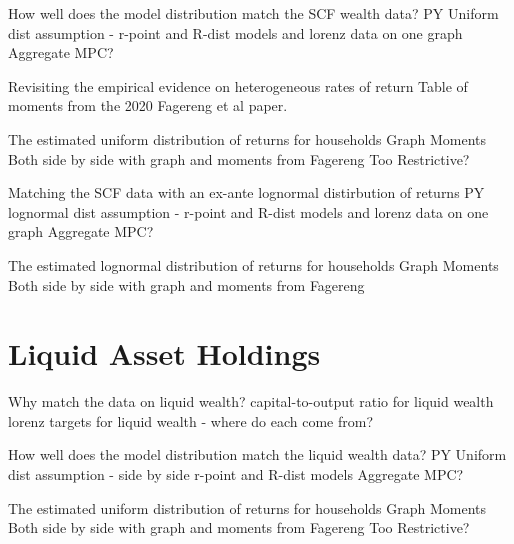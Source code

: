 \documentclass[pdflatex]{beamer}
\begin{document}
\begin{frame}{How well does the model distribution match the SCF wealth data?}
  PY Uniform dist assumption - r-point and R-dist models and lorenz data on one graph
  Aggregate MPC?
\end{frame}

\begin{frame}{Revisiting the empirical evidence on heterogeneous rates of return}
  Table of moments from the 2020 Fagereng et al paper.
\end{frame}

\begin{frame}{The estimated uniform distribution of returns for households}
  Graph 
  Moments
      Both side by side with graph and moments from Fagereng
  Too Restrictive?
\end{frame}

\begin{frame}{Matching the SCF data with an ex-ante lognormal distirbution of returns}
  PY lognormal dist assumption - r-point and R-dist models and lorenz data on one graph
  Aggregate MPC?
\end{frame}

\begin{frame}{The estimated lognormal distribution of returns for households}
  Graph
  Moments
      Both side by side with graph and moments from Fagereng
\end{frame}

\section{Liquid Asset Holdings}

\begin{frame}{Why match the data on liquid wealth?}
  capital-to-output ratio for liquid wealth
  lorenz targets for liquid wealth
  - where do each come from?
\end{frame}

\begin{frame}{How well does the model distribution match the liquid wealth data?}
  PY Uniform dist assumption - side by side r-point and R-dist models
  Aggregate MPC?
\end{frame}

\begin{frame}{The estimated uniform distribution of returns for households}
  Graph 
  Moments
      Both side by side with graph and moments from Fagereng
  Too Restrictive?
\end{frame}
\end{document}

